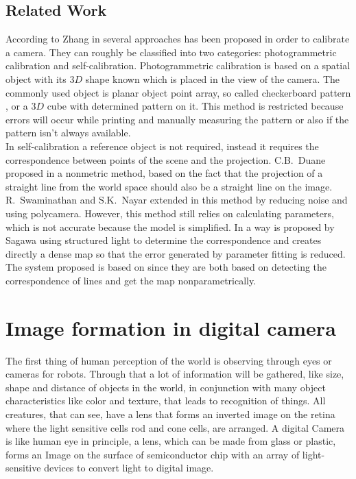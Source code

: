 \documentclass[journal,final,a4paper,twoside]{PS}
\begin{document}
\subsection{Related Work}
\label{sec:related}
According to Zhang in \cite{Zhang} several approaches has been proposed in order to calibrate a camera. They can roughly be classified into two categories: photogrammetric calibration and self-calibration.
Photogrammetric calibration is based on a spatial object with its $3D$ shape known which is placed in the view of the camera. The commonly used object is planar object point array, so called checkerboard pattern \cite{Zhang}, or a $3D$ cube with determined pattern on it. This method is restricted because errors will occur while printing and manually measuring the pattern or also if the pattern isn't always available.\\
In self-calibration \cite{Faugeras} a reference object is not required, instead it requires the correspondence between points of the scene and the projection. C.B.~Duane proposed in \cite{Duane} a nonmetric method, based on the fact that the projection of a straight line from the world space should also be a straight line on the image. R.~Swaminathan and S.K.~Nayar extended in \cite{Swaminathan} this method by reducing noise and using polycamera. However, this method still relies on calculating parameters, which is not accurate because the model is simplified. 
In \cite{Sagawa} a way is proposed by Sagawa using structured light to determine the correspondence and creates directly a dense map so that the error generated by parameter fitting is reduced. 
The system proposed is based on \cite{Sagawa} since they are both based on detecting the correspondence of lines and get the map nonparametrically.







\section{Image formation in digital camera}
\label{sec:imageFormation}
The first thing of human perception of the world is observing through eyes or cameras for robots. Through that a lot of information will be gathered, like size, shape and distance of objects in the world, in conjunction with many object characteristics like color and texture, that leads to recognition of things.
All creatures, that can see, have a lens that forms an inverted image on the retina where the light sensitive cells rod and cone cells, are arranged. A digital Camera is like human eye in principle, a lens, which can be made from glass or plastic, forms an Image on the surface of semiconductor chip with an array of light-sensitive devices to convert light to digital image.
\end{document}
